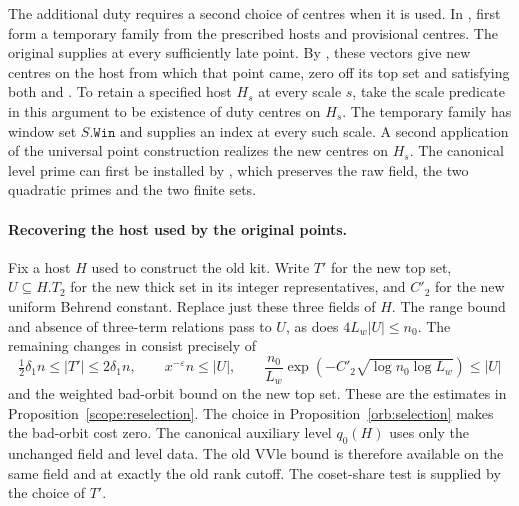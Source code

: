 The additional duty  requires a second choice of centres when
it is used. In , first form a temporary family from the
prescribed hosts and provisional  centres. The original
 supplies
 at every sufficiently late point. By
, these vectors give new
centres on the host from which that point came, zero off its top set and
satisfying both  and . To retain a specified host
\(H_s\) at every scale \(s\), take the scale predicate in this argument to
be existence of duty centres on \(H_s\). The temporary family has window
set \(S.\mathtt{Win}\) and supplies an index at every such scale. A second
application of the universal point construction realizes the new centres
on \(H_s\). The canonical level prime can first be installed by
, which preserves the raw field, the two
quadratic primes and the two finite sets.

\paragraph{Recovering the host used by the original points.}
Fix a host \(H\) used to construct the old kit. Write \(T'\) for the new
top set, \(U\subseteq H.T_2\) for the new thick set in its integer
representatives, and \(C'_2\) for the new uniform Behrend constant.
Replace just these three fields of \(H\). The range bound and absence of
three-term relations pass to \(U\), as does
\(4L_w|U|\le n_0\). The remaining changes in  consist
precisely of
\[
 \tfrac12\delta_1 n\le|T'|\le2\delta_1 n,\qquad
 x^{-\varepsilon}n\le|U|,\qquad
 \frac{n_0}{L_w}\exp\!\left(-C'_2\sqrt{\log n_0\log L_w}\right)
 \le |U|
\]
and the weighted bad-orbit bound on the new top set. These are the
estimates in Proposition~\ref{scope:reselection}. The choice in
Proposition~\ref{orb:selection} makes the bad-orbit cost zero.
The canonical auxiliary level \(q_0(H)\) uses only the unchanged field
and level data. The old \(\mathrm{VVle}\) bound is therefore available
on the same field and at exactly the old rank cutoff. The coset-share
test is supplied by the choice of \(T'\).

